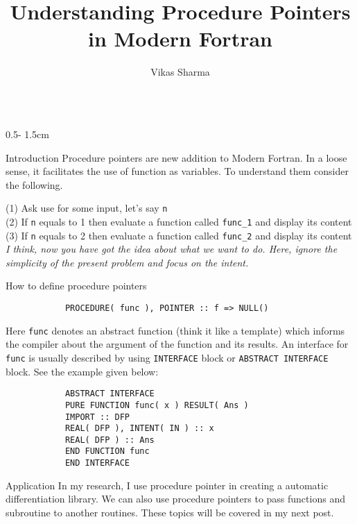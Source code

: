 \documentclass{uioposter}
\title{Understanding Procedure Pointers in Modern Fortran}
\author
{%
    Vikas Sharma \inst{1}
}
\institute
{
    \inst{1} Civil Engineering Department \\
    IIT Bombay, Mumbai, India
}
\begin{document}
\begin{columns}[onlytextwidth]


\begin{column}{0.5\textwidth - 1.5cm}
    \begin{block}{Introduction}
	Procedure pointers are new addition to Modern Fortran. In a loose sense, it facilitates the use of function as variables. To understand them consider the following.

		(1) Ask use for some input, let's say \verb|n|
		\\
		(2) If \verb|n| equals to 1 then evaluate a function called \verb|func_1|
		and display its content
		\\
		(3) If \verb|n| equals to 2 then evaluate a function called \verb|func_2|
		and display its content
		\\
		\textit{I think, now you have got the idea about what we want to do. Here,
		ignore the simplicity of the present problem and focus on the intent.}
    \end{block}

	\begin{block}{How to define procedure pointers}
		\begin{verbatim}
			PROCEDURE( func ), POINTER :: f => NULL()
		\end{verbatim}

		Here \verb|func| denotes an abstract function (think it like a template) which informs the compiler about  the argument of the function and its results. An interface for \verb|func| is usually described by using \verb|INTERFACE| block or \verb|ABSTRACT INTERFACE| block. See the example given below:

		\begin{verbatim}
			ABSTRACT INTERFACE
			PURE FUNCTION func( x ) RESULT( Ans )
			IMPORT :: DFP
			REAL( DFP ), INTENT( IN ) :: x
			REAL( DFP ) :: Ans
			END FUNCTION func
			END INTERFACE
		\end{verbatim}
	\end{block}

\begin{block}{Application}
	In my research, I use procedure pointer in creating a automatic differentiation library. We can also use procedure pointers to pass functions and subroutine to another routines. These topics will be covered in my next post.
\end{block}



\end{column}
\end{columns}
\end{document}
